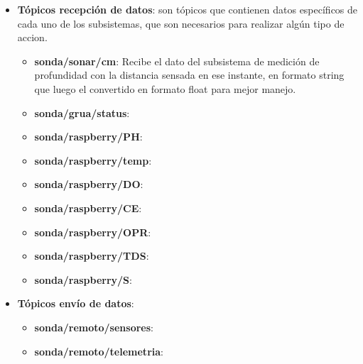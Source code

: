 \begin{itemize}
\begin{itemize}
    \end{itemize}
    \item \textbf{T\'opicos recepci\'on de datos}: son t\'opicos que contienen datos espec\'ificos de cada uno de los subsistemas, que son necesarios para realizar alg\'un tipo de accion. 
        \begin{itemize}
        \item \textbf{sonda/sonar/cm}: Recibe el dato del subsistema de medici\'on de profundidad con la distancia sensada en ese instante, en formato string que luego el convertido en formato float para mejor manejo. 
        \item \textbf{sonda/grua/status}:
        \item \textbf{sonda/raspberry/PH}:
        \item \textbf{sonda/raspberry/temp}:
        \item \textbf{sonda/raspberry/DO}:
        \item \textbf{sonda/raspberry/CE}:
        \item \textbf{sonda/raspberry/OPR}:
        \item \textbf{sonda/raspberry/TDS}:
        \item \textbf{sonda/raspberry/S}:
    \end{itemize}
    \item \textbf{T\'opicos env\'io de datos}:
        \begin{itemize}
        \item \textbf{sonda/remoto/sensores}:
        \item \textbf{sonda/remoto/telemetria}:
    \end{itemize}
    
\end{itemize}